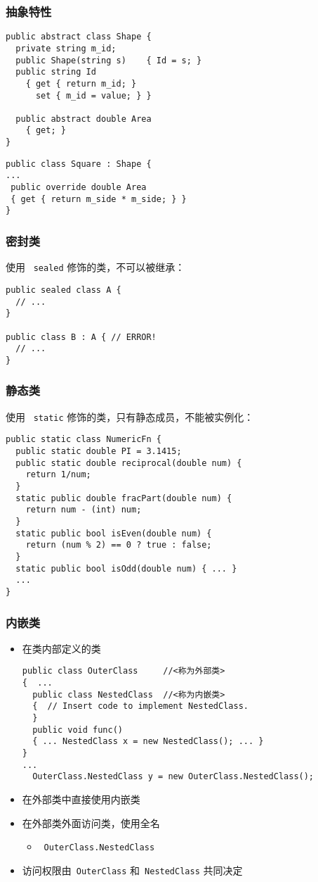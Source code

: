 \begin{frame}[fragile]
\frametitle{抽象特性}
\begin{lstlisting}
public abstract class Shape {
  private string m_id;
  public Shape(string s)    { Id = s; }
  public string Id
    { get { return m_id; }
      set { m_id = value; } }

  public abstract double Area
    { get; }
}
\end{lstlisting}
\begin{lstlisting}
public class Square : Shape {
...
 public override double Area
 { get { return m_side * m_side; } }
}
\end{lstlisting}
\end{frame}

\begin{frame}[fragile]
\frametitle{密封类}
使用 ~\texttt{sealed} 修饰的类，不可以被继承：
\begin{lstlisting}
public sealed class A {
  // ...
}

public class B : A { // ERROR!
  // ...
}
\end{lstlisting}

\end{frame}

\begin{frame}[fragile]
\frametitle{静态类}
使用 ~\texttt{static} 修饰的类，只有静态成员，不能被实例化：
\begin{lstlisting}[escapeinside=<>]
public static class NumericFn {
  public static double PI = 3.1415;
  public static double reciprocal(double num) {
    return 1/num;
  }
  static public double fracPart(double num) {
    return num - (int) num;
  }
  static public bool isEven(double num) {
    return (num % 2) == 0 ? true : false;
  }
  static public bool isOdd(double num) { ... }
  ...
}
\end{lstlisting}
\end{frame}

\begin{frame}[fragile]
\frametitle{内嵌类}
\begin{itemize}
\item 在类内部定义的类
\begin{lstlisting}[escapeinside=<>]
public class OuterClass     //<称为外部类>
{  ...
  public class NestedClass  //<称为内嵌类>
  {  // Insert code to implement NestedClass.
  }
  public void func()
  { ... NestedClass x = new NestedClass(); ... }
}
...
  OuterClass.NestedClass y = new OuterClass.NestedClass();
\end{lstlisting}
\item 在外部类中直接使用内嵌类
\item 在外部类外面访问类，使用全名
  \begin{itemize}
  \item ~\texttt{OuterClass.NestedClass}
  \end{itemize}
\item 访问权限由~\texttt{OuterClass} 和~\texttt{NestedClass} 共同决定
\end{itemize}
\end{frame}

